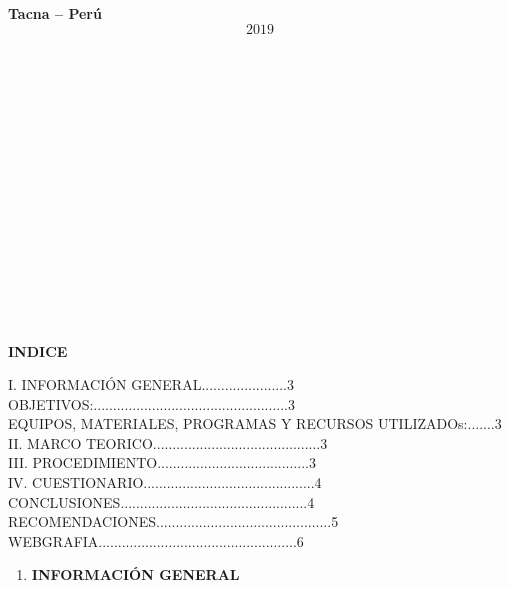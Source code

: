 \documentclass{article} %
\begin{document}
\noindent 

\noindent 

\noindent \textbf{Tacna -- Per\'{u}}
\[2019\]
\\
\\
\\
\\
\\
\\
\\
\\
\\
\\
\\
\\
\\
\\
\\
\textbf{}

\noindent \textbf{}

\noindent \textbf{INDICE}

\noindent 

\noindent
\begin{center}
\begin{flushleft}
I.	INFORMACIÓN GENERAL......................3\\
OBJETIVOS:..................................................3\\
EQUIPOS, MATERIALES, PROGRAMAS Y RECURSOS UTILIZADOs:.......3\\
II.	MARCO TEORICO...........................................3\\
III.	PROCEDIMIENTO.......................................3\\
IV.	CUESTIONARIO............................................4\\
CONCLUSIONES................................................4\\
RECOMENDACIONES.............................................5\\
WEBGRAFIA...................................................6\\
\end{flushleft}
\end{center}

\noindent \textbf{\eject }

\noindent \textbf{}

\noindent \textbf{\textit{}}

\noindent 

\begin{enumerate}
\item  \textbf{INFORMACI\'{O}N GENERAL}
\end{enumerate}
\end{document}

